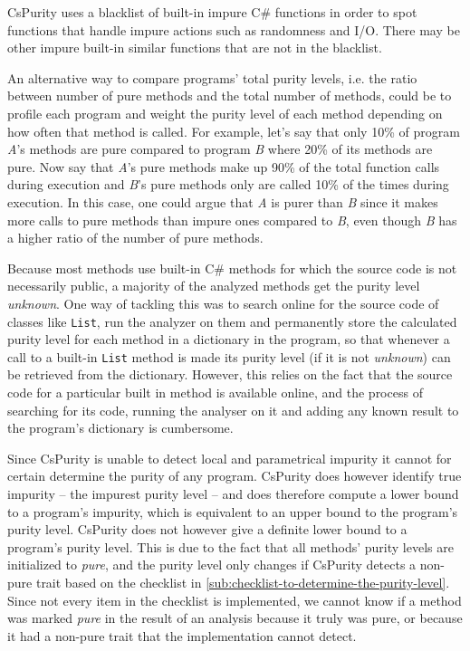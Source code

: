 \documentclass[a4paper,12pt]{article}
\begin{document}

CsPurity uses a blacklist of built-in impure C\# functions in order to spot functions that handle impure actions such as randomness and I/O. There may be other impure built-in similar functions that are not in the blacklist.

An alternative way to compare programs' total purity levels, i.e. the ratio between number of pure methods and the total number of methods, could be to profile each program and weight the purity level of each method depending on how often that method is called. For example, let's say that only 10\% of program \textit{A}'s methods are pure compared to program \textit{B} where 20\% of its methods are pure. Now say that \textit{A}'s pure methods make up 90\% of the total function calls during execution and \textit{B}'s pure methods only are called 10\% of the times during execution. In this case, one could argue that \textit{A} is purer than \textit{B} since it makes more calls to pure methods than impure ones compared to \textit{B}, even though \textit{B} has a higher ratio of the number of pure methods.

Because most methods use built-in C\# methods for which the source code is not necessarily public, a majority of the analyzed methods get the purity level \textit{unknown}. One way of tackling this was to search online for the source code of classes like \texttt{List}, run the analyzer on them and permanently store the calculated purity level for each method in a dictionary in the program, so that whenever a call to a built-in \texttt{List} method is made its purity level (if it is not \textit{unknown}) can be retrieved from the dictionary. However, this relies on the fact that the source code for a particular built in method is available online, and the process of searching for its code, running the analyser on it and adding any known result to the program's dictionary is cumbersome.

Since CsPurity is unable to detect local and parametrical impurity it cannot for certain determine the purity of any program. CsPurity does however identify true impurity -- the impurest purity level -- and does therefore compute a lower bound to a program's impurity, which is equivalent to an upper bound to the program's purity level. CsPurity does not however give a definite lower bound to a program's purity level. This is due to the fact that all methods' purity levels are initialized to \textit{pure}, and the purity level only changes if CsPurity detects a non-pure trait based on the checklist in \autoref{sub:checklist-to-determine-the-purity-level}. Since not every item in the checklist is implemented, we cannot know if a method was marked \textit{pure} in the result of an analysis because it truly was pure, or because it had a non-pure trait that the implementation cannot detect.
\end{document}

